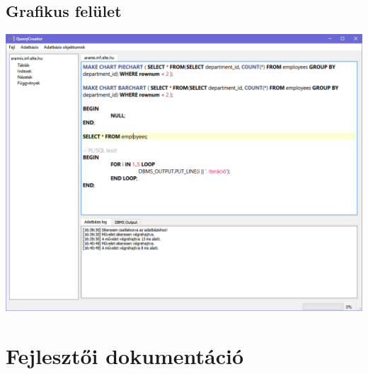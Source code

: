 \documentclass{elteikthesis}
\begin{document}
\section{Grafikus felület}
\includegraphics[width=1.0\textwidth]{gui}

\chapter{Fejlesztői dokumentáció}
\end{document}
